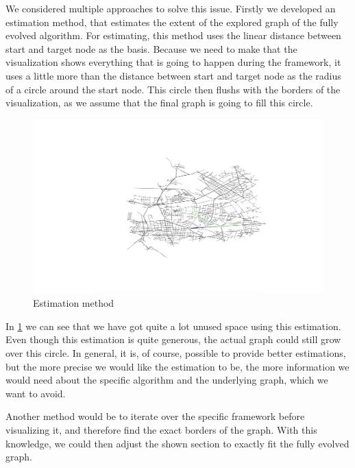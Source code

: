 \documentclass
[
    paper = a4,
    pagesize,
    12 pt,
    oneside,                       %
    open = right,
    DIV = calc,
    BCOR = 0 mm,                   %
    bibtotoc
]
{scrbook}
\begin{document}
We considered multiple approaches to solve this issue.
Firstly we developed an estimation method, that estimates the extent of the explored graph of the fully evolved algorithm.
For estimating, this method uses the linear distance between start and target node as the basis.
Because we need to make that the visualization shows everything that is going to happen during the framework, it uses a little more than the distance between start and target node as the radius of a circle around the start node.
This circle then flushs with the borders of the visualization, as we assume that the final graph is going to fill this circle.

\begin{figure}[H]
    \includegraphics[width=\textwidth]{Images/vis-estimation.png}
\caption[]{Estimation method}
\label{fig:estimation}
\end{figure}

In \cref{fig:estimation} we can see that we have got quite a lot unused space using this estimation.
Even though this estimation is quite generous, the actual graph could still grow over this circle.
In general, it is, of course, possible to provide better estimations, but the more precise we would like the estimation to be, the more information we would need about the specific algorithm and the underlying graph, which we want to avoid.

Another method would be to iterate over the specific framework before visualizing it, and therefore find the exact borders of the graph.
With this knowledge, we could then adjust the shown section to exactly fit the fully evolved graph.
\end{document}
